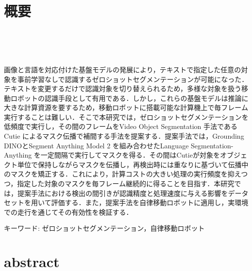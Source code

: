 \chapter*{概要}
\thispagestyle{empty}
%
\begin{center}
  \\
  \\
   \\
\end{center}
\vspace{1.0zh}

画像と言語を対応付けた基盤モデルの発展により，テキストで指定した任意の対象を事前学習なしで認識するゼロショットセグメンテーションが可能になった．テキストを変更するだけで認識対象を切り替えられるため，多様な対象を扱う移動ロボットの認識手段として有用である．しかし，これらの基盤モデルは推論に大きな計算資源を要するため，移動ロボットに搭載可能な計算機上で毎フレーム実行することは難しい．そこで本研究では，ゼロショットセグメンテーションを低頻度で実行し，その間のフレームをVideo Object Segmentation 手法であるCutie によるマスク伝播で補間する手法を提案する．提案手法では，Grounding DINOとSegment Anything Model 2 を組み合わせたLanguage Segmentation-Anything を一定間隔で実行してマスクを得る．その間はCutieが対象をオブジェクト単位で保持しながらマスクを伝播し，再検出時には重なりに基づいて伝播中のマスクを矯正する．これにより，計算コストの大きい処理の実行頻度を抑えつつ，指定した対象のマスクを毎フレーム継続的に得ることを目指す．本研究では，提案手法における検出の間引きが認識精度と処理速度に与える影響をデータセットを用いて評価する．また，提案手法を自律移動ロボットに適用し，実環境での走行を通じてその有効性を検証する．
%


キーワード: ゼロショットセグメンテーション，自律移動ロボット

%
\newpage
\chapter*{abstract}
\thispagestyle{empty}
%
\begin{center}
  \\
  \\
\end{center}
\vspace{1.0zh}

